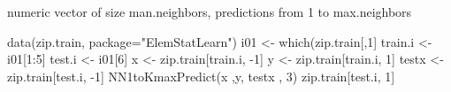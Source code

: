 \documentclass[a4paper]{book}
\begin{document}
%
\begin{Value}
numeric vector of size man.neighbors, predictions from 1 to max.neighbors
\end{Value}
%
\begin{Examples}
\begin{ExampleCode}
data(zip.train, package="ElemStatLearn")
i01 <- which(zip.train[,1] %
train.i <- i01[1:5]
test.i <- i01[6]
x <- zip.train[train.i, -1]
y <- zip.train[train.i, 1]
testx <- zip.train[test.i, -1]
NN1toKmaxPredict(x ,y, testx , 3)
zip.train[test.i, 1]

\end{ExampleCode}
\end{Examples}
\printindex{}
\end{document}
